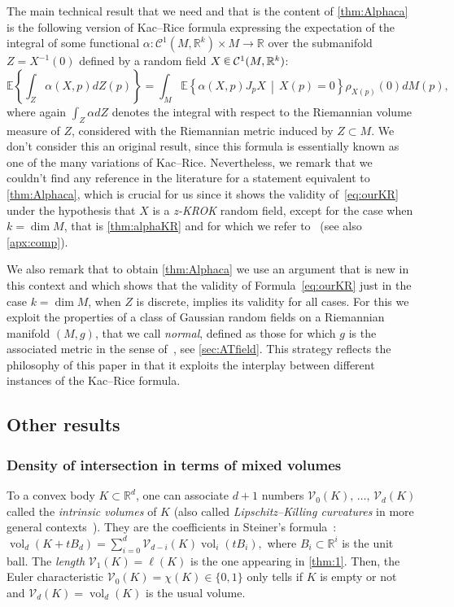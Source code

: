 \documentclass[AHL, Unicode, longabstracts, published]{cedram}
\newcommand{\R}{\mathbb{R}}
\newcommand{\EE}{\mathbb{E}}
\DeclareMathOperator{\vol}{vol}
\newcommand{\Vint}{\mathcal{V}}
\newcommand{\mC}{\mathcal{C}}
\newcommand{\zkrok}{\emph{z-KROK}\xspace}
\renewcommand{\a}{\alpha}
\newcommand*\randin{
\mathchoice {\raisebox{-.35ex}{$\displaystyle{^\subset}$}\mkern-11.5mu\raisebox{+.45ex}{$\displaystyle{_\subset}$}} {\mkern+1mu\raisebox{-.27ex}{$\textstyle{^\subset}$}\mkern-11.7mu\raisebox{+.45ex}{$\textstyle{_\subset}$}} {\raisebox{.35ex}{$\scriptstyle\subset$}\mkern-14mu\raisebox{-.15ex}{$\scriptstyle\subset$}} {\raisebox{.3ex}{$\scriptscriptstyle\subset$}\mkern-13.5mu\raisebox{-.10ex}{$\scriptscriptstyle\subset$}}}
\begin{document}
The main technical result that we need and that is the content of \cref{thm:Alphaca} is the following version of Kac--Rice formula expressing the expectation of the integral of some functional $\a\colon \mC^1(M,\R^k)\times M\to \R$ over the submanifold $Z=X^{-1}(0)$ defined by a random field $X\,\randin\, \mC^1(M,\R^k)$:
\begin{equation}\label{eq:ourKR}
\EE\left\{\int_{ Z}\alpha(X,p)dZ(p)\right\}=\int_M
\EE\left\{ \a(X,p)J_pX\,\middle|\,X(p)=0\right\} \rho_{X(p)}(0)dM(p),
\end{equation}
where again $\int_Z\a dZ$ denotes the integral with respect to the Riemannian volume measure of $Z$, considered with the Riemannian metric induced by $Z\subset M$. We don't consider this an original result, since this formula is essentially known as one of the many variations of Kac--Rice. Nevertheless, we remark that we couldn't find any reference in the literature for a statement equivalent to \cref{thm:Alphaca}, which is crucial for us since it shows the validity of~\eqref{eq:ourKR} under the hypothesis that $X$ is a {\zkrok} random field, except for the case when $k=\dim M$, that is \cref{thm:alphaKR} and for which we refer to~\cite{KRStec} (see also \cref{apx:comp}).

We also remark that to obtain \cref{thm:Alphaca} we use an argument that is new in this context and which shows that the validity of Formula~\eqref{eq:ourKR} just in the case $k=\dim M$, when $Z$ is discrete, implies its validity for all cases. For this we exploit the properties of a class of Gaussian random fields on a Riemannian manifold $(M,g)$, that we call \emph{normal}, defined as those for which $g$ is the associated metric in the sense of~\cite{AdlerTaylor}, see \cref{sec:ATfield}. This strategy reflects the philosophy of this paper in that it exploits the interplay between different instances of the Kac--Rice formula.


\subsection{Other results}\label{sub:intro:secondary}
\subsubsection{Density of intersection in terms of mixed volumes}

To a convex body $K\subset \R^d$, one can associate $d+1$ numbers $\Vint_0(K),\,\ldots,\,\Vint_d(K)$ called the \emph{intrinsic volumes} of $K$ (also called \emph{Lipschitz--Killing curvatures} in more general contexts~\cite{AdlerTaylor}). They are the coefficients in Steiner's formula~\cite{bible}: $
\vol_d(K+tB_d)=\sum_{i=0}^d\Vint_{d-i}(K)\vol_{i}(tB_{i}), $ where $B_i\subset \R^i$ is the unit ball. The \emph{length} $\Vint_1(K)=\ell(K)$ is the one appearing in \cref{thm:1}. Then, the Euler characteristic $\Vint_0(K)=\chi(K)\in\{0,1\}$ only tells if $K$ is empty or not and $\Vint_d(K)=\vol_d(K)$ is the usual volume.
\end{document}
